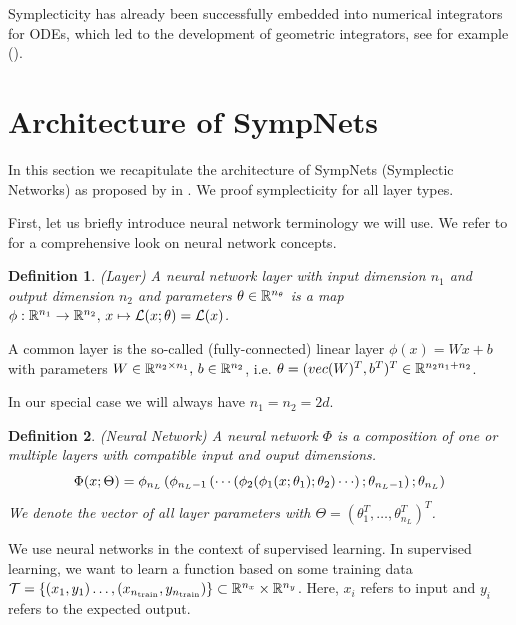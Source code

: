 \documentclass[twoside,a4paper]{article}
\newtheorem{definition}{Definition}
\begin{document}
Symplecticity has already been successfully embedded into numerical integrators for ODEs, which
led to the development of geometric integrators, see for example \citeauthor{hairer2006}
(\cite{hairer2006}).

\section{Architecture of SympNets}

In this section we recapitulate the architecture of SympNets (Symplectic Networks) as
proposed by \citeauthor{Jin2020} in \cite{Jin2020}. We proof
symplecticity for all layer types.

First, let us briefly introduce neural network terminology we will use.
We refer to \cite{Goodfellow2016} for a comprehensive look on neural
network concepts.

\begin{definition}
	(Layer)
	A neural network layer with input dimension $n_1$ and output dimension $n_2$
	and parameters $\theta \in \mathbb{R}^{n_\theta}$ is a map 
	$\phi : \mathbb{R}^{n_1} \to \mathbb{R}^{n_2},\, x \mapsto \mathcal{L}(x;\theta) = \mathcal{L}(x)$.
\end{definition}

A common layer is the so-called (fully-connected) linear layer
$\phi(x) = Wx +b$ with parameters $W \in \mathbb{R}^{n_2 \times n_1},\, b \in \mathbb{R}^{n_2}$,
i.e. $\theta = (vec(W)^T, b^T)^T \in \mathbb{R}^{n_2 n_1 + n_2}$.

In our special case we will always have $n_1 = n_2 = 2d$.

\begin{definition}
	(Neural Network)
	A neural network $\Phi$ is a composition of one or multiple layers with
	compatible input and ouput dimensions. 
	\begin{equation*}
		\Phi(x;\Theta) = \phi_{n_L} \lb \phi_{n_L-1} \lb \cdots
		\lb \phi_2(
		\phi_1(x;\theta_1); \theta_2 ) \cdots \rb ; \theta_{n_L-1} \rb ; \theta_{n_L} \rb
	\end{equation*}
	We denote the vector of all
	layer parameters with $\Theta = (\theta_1^T, \dots, \theta_{n_L}^T)^T$.
\end{definition}

We use neural networks in the context of supervised learning. 
In supervised learning, we want to learn a function based on some training data
$\mathcal{T} = \{(x_1, y_1) \dots, (x_{n_{\text{train}}},y_{n_{\text{train}}}) \}
\subset \mathbb{R}^{n_x} \times \mathbb{R}^{n_y}$. Here, $x_i$ refers to input
and $y_i$ refers to the expected output.
\end{document}
